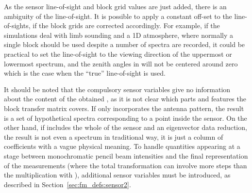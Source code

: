 As the sensor line-of-sight and block grid values are just added,
there is an ambiguity of the line-of-sight. It is possible to apply a
constant off-set to the line-of-sights, if the block grids are
corrected accordingly. For example, if the simulations deal with limb
sounding and a 1D atmosphere, where normally a single block should be
used despite a number of spectra are recorded, it could be practical
to set the line-of-sight to the viewing direction of the uppermost or
lowermost spectrum, and the zenith angles in 
will not be centered around zero which is the case when the ``true''
line-of-sight is used.

It should be noted that the compulsory sensor variables give no
information about the content of the obtained \MsrVct, as it is not
clear which parts and features the block transfer matrix covers. If
 only incorporates the antenna pattern, the result is a set
of hypothetical spectra corresponding to a point inside the sensor. On
the other hand, if  includes the whole of the sensor and an
eigenvector data reduction, the result is not even a spectrum in
traditional way, it is just a column of coefficients with a vague
physical meaning. To handle quantities appearing at a stage between
monochromatic pencil beam intensities and the final representation of
the measurements (where the total transformation can involve more
steps than the multiplication with ), additional sensor
variables must be introduced, as described in
Section~\ref{sec:fm_defs:sensor2}.


\label{sec:fm_defs:rte}



%
%
%
%

